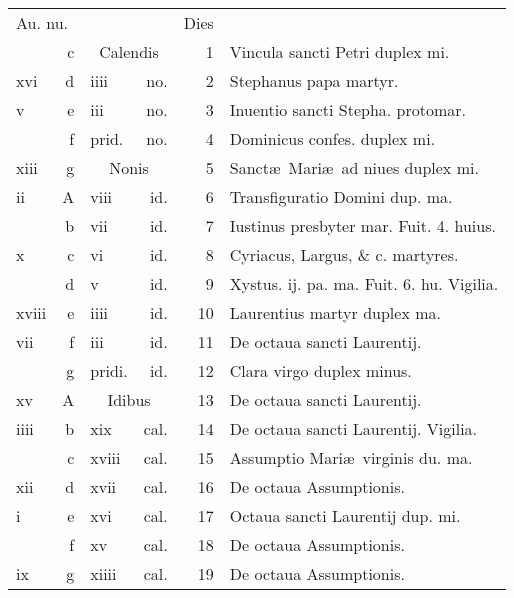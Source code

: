 \documentclass[a5paper,10pt]{book}
\def\ae{æ}
\begin{document}
\begin{center}
\begin{tabular}{l r l r r l}
\multicolumn{2}{l}{\color{red}Au. nu.} & & & \color{red} Dies & \\
 & c & \multicolumn{2}{c}{\color{red} Calendis} & 1 & \color{red} Vincula sancti Petri duplex mi. \color{black} \\
xvi & d & iiii & no. & 2 & Stephanus papa martyr. \color{black} \\
v & e & iii & no. & 3 & \color{red} Inuentio sancti Stepha. protomar. \color{black} \\
 & f & \color{red} prid. & no. & 4 & Dominicus confes. duplex mi. \color{black} \\%
xiii & g & \multicolumn{2}{c}{\color{red} Nonis} & 5 & Sanct\ae \ Mari\ae \ ad niues duplex mi. \color{black} \\
ii & \color{red} A & viii & id. & 6 & \color{red} Transfiguratio Domini dup. ma. \color{black} \\
 & b & vii & id. & 7 & Iustinus presbyter mar. \color{red} Fuit. 4. huius. \color{black} \\
x & c & vi & id. & 8 & Cyriacus, Largus, \& c. martyres. \\
 & d & v & id. & 9 & Xystus. ij. pa. ma. \color{red} Fuit. 6. hu. Vigilia. \color{black} \\
xviii & e & iiii & id. & 10 & \color{red} Laurentius martyr duplex ma. \color{black} \\
vii & f & iii & id. & 11 & De octaua sancti Laurentij. \color{black} \\
 & g & \color{red} pridi. & id. & 12 & Clara virgo duplex minus. \color{black} \\
xv & \color{red} A & \multicolumn{2}{c}{\color{red} Idibus} & 13 & De octaua sancti Laurentij. \\
iiii & b & xix & cal. & 14 & De octaua sancti Laurentij. \color{red} Vigilia. \color{black} \\%
 & c & xviii & cal. & 15 & \color{red} Assumptio Mari\ae \ virginis du. ma. \color{black} \\
xii & d & xvii & cal. & 16 & De octaua Assumptionis. \\
i & e & xvi & cal. & 17 & Octaua sancti Laurentij dup. mi. \\
 & f & xv & cal. & 18 & De octaua Assumptionis. \\
ix & g & xiiii & cal. & 19 & De octaua Assumptionis. \color{black} \\

\end{tabular}
\end{center}
\end{document}
